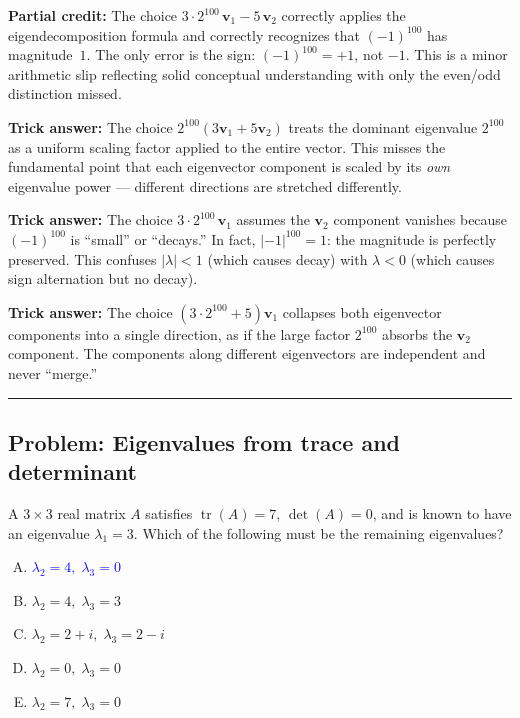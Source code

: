\documentclass[12pt]{amsart}
\newcommand{\divider}{
  \vspace{-1em}
  \noindent
  \raisebox{-0.15ex}{\textbullet}%
  \hspace{0.5em}%
  \rule[0.5ex]{0.95\textwidth}{1.0pt}%
  \hspace{0.5em}%
  \raisebox{-0.15ex}{\textbullet}%
  \vspace{0em}
}
\begin{document}
\textbf{Partial credit:}
The choice $3 \cdot 2^{100}\,\mathbf{v}_1 - 5\,\mathbf{v}_2$ correctly
applies the eigendecomposition formula and correctly recognizes that
$(-1)^{100}$ has magnitude~$1$. The only error is the sign:
$(-1)^{100} = +1$, not $-1$. This is a minor arithmetic slip reflecting
solid conceptual understanding with only the even/odd distinction missed.

\textbf{Trick answer:}
The choice $2^{100}(3\mathbf{v}_1 + 5\mathbf{v}_2)$ treats the dominant
eigenvalue $2^{100}$ as a uniform scaling factor applied to the entire
vector. This misses the fundamental point that each eigenvector component
is scaled by its \emph{own} eigenvalue power --- different directions are
stretched differently.

\textbf{Trick answer:}
The choice $3 \cdot 2^{100}\,\mathbf{v}_1$ assumes the $\mathbf{v}_2$
component vanishes because $(-1)^{100}$ is ``small'' or ``decays.'' In
fact, $|-1|^{100} = 1$: the magnitude is perfectly preserved. This
confuses $|\lambda| < 1$ (which causes decay) with $\lambda < 0$ (which
causes sign alternation but no decay).

\textbf{Trick answer:}
The choice $(3 \cdot 2^{100} + 5)\mathbf{v}_1$ collapses both eigenvector
components into a single direction, as if the large factor $2^{100}$
absorbs the $\mathbf{v}_2$ component. The components along different
eigenvectors are independent and never ``merge.''

\divider

\subsection*{Problem: Eigenvalues from trace and determinant}

A $3 \times 3$ real matrix $A$ satisfies $\operatorname{tr}(A) = 7$,
$\det(A) = 0$, and is known to have an eigenvalue $\lambda_1 = 3$.
Which of the following must be the remaining eigenvalues?

\begin{enumerate}[(A)]
\item \textcolor{blue}{\textbf{$\lambda_2 = 4,\; \lambda_3 = 0$}}
\item $\lambda_2 = 4,\; \lambda_3 = 3$
\item $\lambda_2 = 2+i,\; \lambda_3 = 2-i$
\item $\lambda_2 = 0,\; \lambda_3 = 0$
\item $\lambda_2 = 7,\; \lambda_3 = 0$
\end{enumerate}
\end{document}
